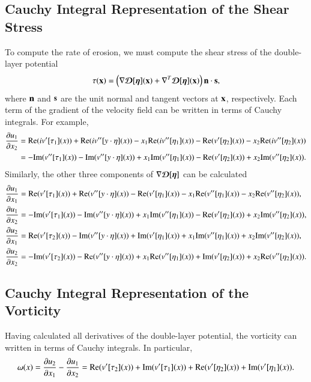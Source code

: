 \documentclass[preprint, 10pt]{elsarticle}
\begin{document}
\subsection{Cauchy Integral Representation of the Shear Stress}
To compute the rate of erosion, we must compute the shear stress of the
double-layer potential
\begin{align}
  \tau(\xx) = \left(\nabla \DDD[\eeta](\xx) + 
    \nabla^T \DDD[\eeta](\xx) \right) \nn \cdot \ss,
\end{align} where $\nn$ and $\ss$ are the unit normal and tangent
vectors at $\xx$, respectively.  Each term of the gradient of the
velocity field can be written in terms of Cauchy integrals.  For
example,
\begin{align}
  \pderiv{u_1}{x_2} &= \Re(iv'[\tau_1](x)) + 
      \Re(i v''[y \cdot \eta](x)) -
      x_1\Re(i v''[\eta_1](x))  -
      \Re(v'[\eta_2](x)) - x_2 \Re(iv''[\eta_2](x)) \\
    &= -\Im(v''[\tau_1](x)) - 
      \Im(v''[y \cdot \eta](x)) +
      x_1\Im(v''[\eta_1](x)) -
      \Re(v'[\eta_2](x)) + x_2 \Im(v''[\eta_2](x)).
\end{align}
Similarly, the other three components of $\nabla \DDD[\eeta]$ can be
calculated
\begin{align}
  \pderiv{u_1}{x_1} &= \Re (v'[\tau_1](x)) + 
    \Re (v''[y\cdot\eta](x)) - \Re (v'[\eta_1](x)) - 
    x_1\Re (v''[\eta_1](x)) - x_2\Re (v''[\eta_2](x)), \\
  \pderiv{u_1}{x_2} &= - \Im (v'[\tau_1](x)) - 
    \Im (v''[y\cdot\eta](x)) + x_1\Im (v''[\eta_1](x)) - 
    \Re (v'[\eta_2](x)) + x_2\Im (v''[\eta_2](x)), \\
  \pderiv{u_2}{x_1} &= \Re (v'[\tau_2](x)) - 
    \Im (v''[y\cdot\eta](x)) + \Im (v'[\eta_1](x)) +
    x_1\Im (v''[\eta_1](x)) + x_2\Im (v''[\eta_2](x)), \\
  \pderiv{u_2}{x_2} &= -\Im (v'[\tau_2](x)) - 
    \Re (v''[y\cdot\eta](x)) + x_1\Re (v''[\eta_1](x)) +
    \Im (v'[\eta_2](x)) + x_2\Re (v''[\eta_2](x)).
\end{align}

\subsection{Cauchy Integral Representation of the Vorticity}
Having calculated all derivatives of the double-layer potential, the
vorticity can written in terms of Cauchy integrals.  In particular,
\begin{align}
  \omega(x) = \pderiv{u_2}{x_1} - \pderiv{u_1}{x_2} = 
\Re (v'[\tau_2](x)) + \Im (v'[\tau_1](x)) 
 + \Re (v'[\eta_2](x))+ \Im (v'[\eta_1](x)).
\end{align}
\end{document}
